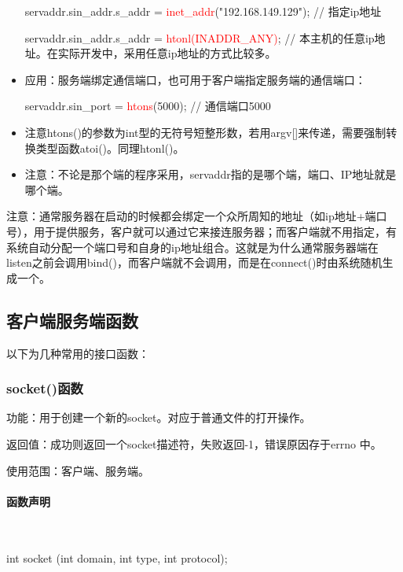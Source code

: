 \documentclass[UTF8]{article}%
\begin{document}
\begin{itemize}
    servaddr.sin\_addr.s\_addr = \textcolor{red}{inet\_addr}("192.168.149.129");  // 指定ip地址  
    
    servaddr.sin\_addr.s\_addr = \textcolor{red}{htonl(INADDR\_ANY)};  // 本主机的任意ip地址。在实际开发中，采用任意ip地址的方式比较多。

    \item 应用：服务端绑定通信端口，也可用于客户端指定服务端的通信端口：
    
    servaddr.sin\_port = \textcolor{red}{htons}(5000);  // 通信端口5000

    \item 注意htons()的参数为int型的无符号短整形数，若用argv[]来传递，需要强制转换类型函数atoi()。同理htonl()。

    \item 注意：不论是那个端的程序采用，servaddr指的是哪个端，端口、IP地址就是哪个端。

\end{itemize}

注意：通常服务器在启动的时候都会绑定一个众所周知的地址（如ip地址+端口号），用于提供服务，客户就可以通过它来接连服务器；而客户端就不用指定，有系统自动分配一个端口号和自身的ip地址组合。这就是为什么通常服务器端在listen之前会调用bind()，而客户端就不会调用，而是在connect()时由系统随机生成一个。

\subsection{客户端服务端函数}

以下为几种常用的接口函数：

\subsubsection{socket()函数}

功能：用于创建一个新的socket。对应于普通文件的打开操作。

返回值：成功则返回一个socket描述符，失败返回-1，错误原因存于errno 中。

使用范围：客户端、服务端。

\paragraph{函数声明}~{}

int socket (int domain, int type, int protocol);
\end{document}
